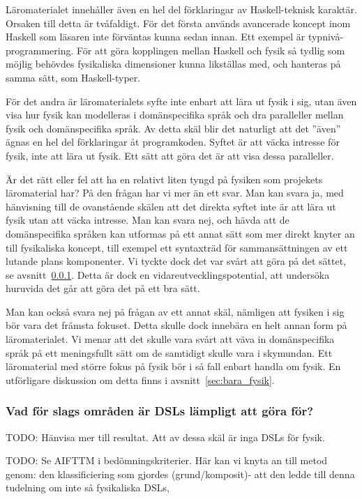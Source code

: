 \begin{binge}
Läromaterialet innehåller även en hel del förklaringar av Haskell-teknisk karaktär. Orsaken till detta är tvåfaldigt. För det första används avancerade koncept inom Haskell som läsaren inte förväntas kunna sedan innan. Ett exempel är typnivå-programmering. För att göra kopplingen mellan Haskell och fysik så tydlig som möjlig behövdes fysikaliska dimensioner kunna likställas med, och hanteras på samma sätt, som Haskell-typer.

För det andra är läromaterialets syfte inte enbart att lära ut fysik i sig, utan även visa hur fysik kan modelleras i domänspecifika språk och dra paralleller mellan fysik och domänspecifika språk. Av detta skäl blir det naturligt att det ''även'' ägnas en hel del förklaringar åt programkoden. Syftet är att väcka intresse för fysik, inte att lära ut fysik. Ett sätt att göra det är att visa dessa paralleller.

Är det rätt eller fel att ha en relativt liten tyngd på fysiken som projekets läromaterial har? På den frågan har vi mer än ett svar. Man kan svara ja, med hänvisning till de ovanstående skälen att det direkta syftet inte är att lära ut fysik utan att väcka intresse. Man kan svara nej, och hävda att de domänspecifika språken kan utformas på ett annat sätt som mer direkt knyter an till fysikaliska koncept, till exempel ett syntaxträd för sammansättningen av ett lutande plans komponenter. Vi tyckte dock det var svårt att göra på det sättet, se avsnitt~\ref{sec:lampligt}. Detta är dock en vidareutvecklingspotential, att undersöka huruvida det går att göra det på ett bra sätt.

Man kan också svara nej på frågan av ett annat skäl, nämligen att fysiken i sig bör vara det främsta fokuset. Detta skulle dock innebära en helt annan form på läromaterialet. Vi menar att det skulle vara svårt att väva in domänspecifika språk på ett meningsfullt sätt om de samtidigt skulle vara i skymundan. Ett läromaterial med större fokus på fysik bör i så fall enbart handla om fysik. En utförligare diskussion om detta finns i avsnitt~\ref{sec:bara_fysik}.

\subsubsection{Vad för slags områden är DSLs lämpligt att göra för?}
\label{sec:lampligt}

TODO: Hänvisa mer till resultat. Att av dessa skäl är inga DSLs för fysik.

TODO: Se AIFTTM i bedömningskriterier. Här kan vi knyta an till metod genom: den klassificiering som gjordes (grund/komposit)- att den ledde till denna tudelning om inte så fysikaliska DSLs, 


\end{binge}
